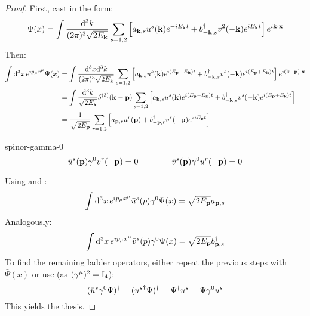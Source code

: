 \begin{proofbox}
  \begin{proof}
    First, cast  in the form:
    \begin{equation*}
      \Psi(x) = \int \frac{\mathrm{d}^3k}{(2\pi)^3 \sqrt{2E_{\mathbf{k}}}} \sum_{s = 1,2} \left[ a_{\mathbf{k},s} u^s(\mathbf{k}) e^{-i E_{\mathbf{k}} t} + b_{-\mathbf{k},s}^\dagger v^2(-\mathbf{k}) e^{i E_{\mathbf{k}} t} \right] e^{i \mathbf{k} \cdot \mathbf{x}}
    \end{equation*}
    Then:
    \begin{equation*}
      \begin{split}
        \int \mathrm{d}^3x\, e^{i p_\mu x^\mu} \Psi(x)
        & = \int \frac{\mathrm{d}^3x \mathrm{d}^3k}{(2\pi)^3 \sqrt{2E_{\mathbf{k}}}} \sum_{s = 1,2} \left[ a_{\mathbf{k},s} u^s(\mathbf{k}) e^{i (E_{\mathbf{p}} - E_{\mathbf{k}}) t} + b_{-\mathbf{k},s}^\dagger v^s(-\mathbf{k}) e^{i (E_{\mathbf{p}} + E_{\mathbf{k}}) t} \right] e^{i (\mathbf{k} - \mathbf{p}) \cdot \mathbf{x}} \\
        & = \int \frac{\mathrm{d}^3k}{\sqrt{2E_{\mathbf{k}}}} \delta^{(3)}(\mathbf{k} - \mathbf{p}) \sum_{s = 1,2} \left[ a_{\mathbf{k},s} u^s(\mathbf{k}) e^{i (E_{\mathbf{p}} - E_{\mathbf{k}}) t} + b_{-\mathbf{k},s}^\dagger v^s(-\mathbf{k}) e^{i (E_{\mathbf{p}} + E_{\mathbf{k}}) t} \right] \\
        & = \frac{1}{\sqrt{2E_{\mathbf{p}}}} \sum_{r = 1,2} \left[ a_{\mathbf{p},r} u^r(\mathbf{p}) + b_{-\mathbf{p},r}^\dagger v^r(-\mathbf{p}) e^{2i E_{\mathbf{p}} t} \right]
      \end{split}
    \end{equation*}

    \begin{lemma}[before upper = {\tcbtitle}, borderline = {1pt}{0pt}{blue!35!black}]{}{spinor-gamma-0}
      \begin{equation}
        \bar{u}^s(\mathbf{p}) \gamma^0 v^r(-\mathbf{p}) = 0
        \qquad \qquad
        \bar{v}^s(\mathbf{p}) \gamma^0 u^r(-\mathbf{p}) = 0
      \end{equation}
    \end{lemma}

    Using  and :
    \begin{equation*}
      \int \mathrm{d}^3x\, e^{i p_\mu x^\mu} \bar{u}^s(p) \gamma^0 \Psi(x) = \sqrt{2E_{\mathbf{p}}} a_{\mathbf{p},s}
    \end{equation*}
    Analogously:
    \begin{equation*}
      \int \mathrm{d}^3x\, e^{i p_\mu x^\mu} \bar{v}^s(p) \gamma^0 \Psi(x) = \sqrt{2E_{\mathbf{p}}} b_{\mathbf{p},s}^\dagger
    \end{equation*}
    To find the remaining ladder operators, either repeat the previous steps with $ \bar{\Psi}(x) $ or use (as $ (\gamma^\mu)^2 = \mathrm{I}_4 $):
    \begin{equation}
      (\bar{u}^s \gamma^0 \Psi)^\dagger = ({u^s}^\dagger \Psi)^\dagger = \Psi^\dagger u^s = \bar{\Psi} \gamma^0 u^s
    \end{equation}
    This yields the thesis.
  \end{proof}
\end{proofbox}

